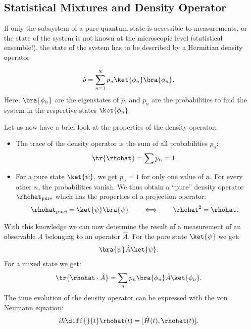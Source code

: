 \subsection{Statistical Mixtures and Density Operator}

If only the subsystem of a pure quantum state is accessible to measurements, or the state of the system is not known at the microscopic level (statistical ensemble!), the state of the system has to be described by a Hermitian density operator

\begin{align}
 \hat{\rho} = \sum_{n=1}^N p_n \ket{\phi_n}\bra{\phi_n}.
\end{align}
Here, $\bra{\phi_n}$ are the eigenstates of $\hat{\rho}$, and $p_n$ are the probabilities to find the system in the respective states $\ket{\phi_n}$.

			Let us now have a brief look at the properties of the density operator:
			\begin{itemize}
				\item The trace of the density operator is the sum of all probabilities $p_n$:
				\begin{align}
					\tr{\rhohat} = \sum p_n = 1.
				\end{align}
				\item For a pure state $\ket{\psi}$, we get $p_n=1$ for only one value of $n$. For every other $n$, the probabilities vanish. We thus obtain a ``pure'' density operator $\rhohat_{\text{pure}}$ which has the properties of a projection operator:
				\begin{align}
					\rhohat_{\text{pure}} = \ket{\psi}\bra{\psi} \qquad \Longleftrightarrow \qquad \rhohat^2 = \rhohat.
				\end{align}
			\end{itemize}
			With this knowledge we can now determine the result of a measurement of an observable $A$ belonging to an operator $\hat{A}$. For the pure state $\ket{\psi}$ we get:
%
			\begin{align}
				\bra{\psi} \hat{A} \ket{\psi}.
			\end{align}
			For a mixed state we get:
			\begin{align}
				\tr{\rhohat \cdot \hat{A}} = \sum_n {p_n} \bra{\phi_n} \hat{A} \ket{\phi_n}.
			\end{align}
			The time evolution of the density operator can be expressed with the von Neumann equation:
			\begin{align}
				i\hbar \diff{}{t}\rhohat(t) = [\hat{H}(t),\rhohat(t)].
			\end{align}

